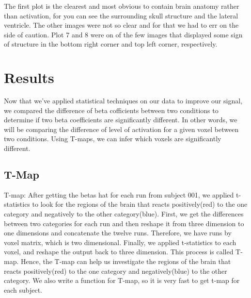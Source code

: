 \documentclass[12pt]{article}
\begin{document}
The first plot is the clearest and most obvious to contain brain anatomy rather 
than activation, for you can see the surrounding skull structure and the 
lateral ventricle. The other images were not so clear and for that we had to 
err on the side of caution. Plot 7 and 8 were on of the few images that 
displayed some sign of structure in the bottom right corner and top left 
corner, respectively.

\section{Results}

Now that we've applied statistical techniques on our data to improve our signal, we compared the difference of beta cofficients between two conditions to determine if two beta coefficients are significantly different. In other words, we will be comparing the difference of level of activation for a given voxel between two conditions. Using T-maps, we can infer which voxels are significantly different.

\subsection{T-Map}

T-map:
After getting the betas hat for each run from subject 001, we applied t-statistics to look for the regions of the brain that reacts positively(red) to the one category and negatively to the other category(blue). First, we get the differences between two categories for each run and then reshape it from three dimension to one dimensions and concatenate the twelve runs. Therefore, we have runs by voxel matrix, which is two dimensional.  Finally, we applied t-statistics to each voxel, and reshape the output back to three dimension. This process is called T-map.  Hence, the T-map can help us investigate the regions of the brain that reacts positively(red) to the one category and negatively(blue) to the other category. We also write a function for T-map, so it is very fast to get t-map for  each subject.
\end{document}
